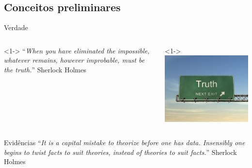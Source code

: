 \documentclass{beamer}
\begin{document}
\subsection{Conceitos preliminares}


\begin{frame}{Verdade}
  \begin{columns}
    \begin{column}{6cm}<1-> ``{\em When you have eliminated the
        impossible, whatever remains, however improbable, must be the
        truth.}'' Sherlock Holmes
    \end{column}
    \begin{column}{4cm}<1->
      \includegraphics[height=0.4\textheight]{Intro/truth}
    \end{column}
  \end{columns}
\end{frame}


\begin{frame}{Evidências}
  ``{\em It is a capital mistake to theorize before one has
    data. Insensibly one begins to twist facts to suit theories,
    instead of theories to suit facts.}'' Sherlock Holmes
\end{frame}

\end{document}
